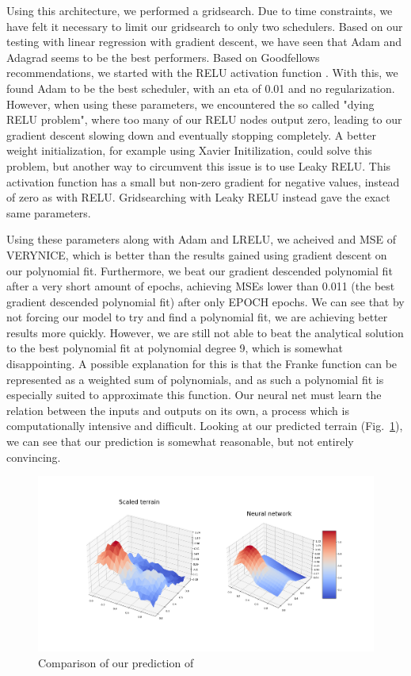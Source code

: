 \documentclass[onecolumn,10pt,cleanfoot]{asme2ej}
\begin{document}
Using this architecture, we performed a gridsearch. Due to time constraints, we have felt it necessary to limit our gridsearch to only two schedulers. Based on our testing with linear regression with gradient descent, we have seen that Adam and Adagrad seems to be the best performers. Based on Goodfellows recommendations, we started with the RELU activation function \cite[188]{gbc}. With this, we found Adam to be the best scheduler, with an eta of 0.01 and no regularization. However, when using these parameters, we encountered the so called "dying RELU problem", where too many of our RELU nodes output zero, leading to our gradient descent slowing down and eventually stopping completely. A better weight initialization, for example using Xavier Initilization, could solve this problem, but another way to circumvent this issue is to use Leaky RELU. This activation function has a small but non-zero gradient for negative values, instead of zero as with RELU. Gridsearching with Leaky RELU instead gave the exact same parameters.

Using these parameters along with Adam and LRELU, we acheived and MSE of VERYNICE, which is better than the results gained using gradient descent on our polynomial fit. Furthermore, we beat our gradient descended polynomial fit after a very short amount of epochs, achieving MSEs lower than 0.011 (the best gradient descended polynomial fit) after only EPOCH epochs. We can see that by not forcing our model to try and find a polynomial fit, we are achieving better results more quickly. However, we are still not able to beat the analytical solution to the best polynomial fit at polynomial degree 9, which is somewhat disappointing. A possible explanation for this is that the Franke function can be represented as a weighted sum of polynomials, and as such a polynomial fit is especially suited to approximate this function. Our neural net must learn the relation between the inputs and outputs on its own, a process which is computationally intensive and difficult. Looking at our predicted terrain (Fig.~\ref{predterrain}), we can see that our prediction is somewhat reasonable, but not entirely convincing.

\begin{figure}[h]
\centerline{\includegraphics[width=6in]{figure/Franke_fit_66x3_lam0.png}}
\caption{Comparison of our prediction of }
\label{predterrain}
\end{figure}
\end{document}
